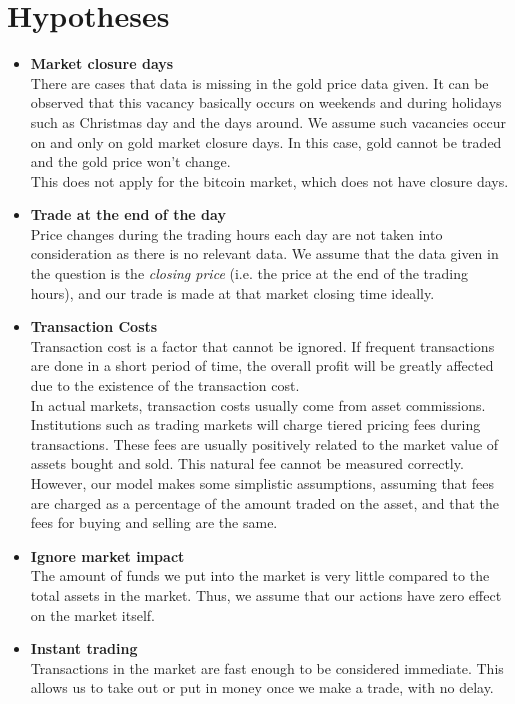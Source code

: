 \documentclass{mcmthesis}
\begin{document}
\section{Hypotheses}

\begin{itemize}
  \item \textbf{Market closure days}\\
  There are cases that data is missing in the gold price data given.
  It can be observed that this vacancy basically occurs on weekends
  and during holidays such as Christmas day and the days around.
  We assume such vacancies occur on and only on gold market closure days.
  In this case, gold cannot be traded and the gold price won't change.\\
  This does not apply for the bitcoin market, which does not have closure days.
  \item \textbf{Trade at the end of the day}\\
  Price changes during the trading hours each day are not taken into consideration
  as there is no relevant data.
  We assume that the data given in the question is the \textit{closing price}
  (i.e. the price at the end of the trading hours),
  and our trade is made at that market closing time ideally.
  \item \textbf{Transaction Costs}\\
  Transaction cost is a factor that cannot be ignored. If frequent transactions are done in a short period of time, the overall profit will be greatly affected due to the existence of the transaction cost.\\
  In actual markets, transaction costs usually come from asset commissions. Institutions such as trading markets will charge tiered pricing fees during transactions. These fees are usually positively related to the market value of assets bought and sold. This natural fee cannot be measured correctly. However, our model makes some simplistic assumptions, assuming that fees are charged as a percentage of the amount traded on the asset, and that the fees for buying and selling are the same.
  \item \textbf{Ignore market impact}\\
  The amount of funds we put into the market is very little
  compared to the total assets in the market.
  Thus, we assume that our actions have zero effect on the market itself.
  \item \textbf{Instant trading}\\
  Transactions in the market are fast enough to be considered immediate.
  This allows us to take out or put in money once we make a trade, with no delay.
\end{itemize}
\end{document}
